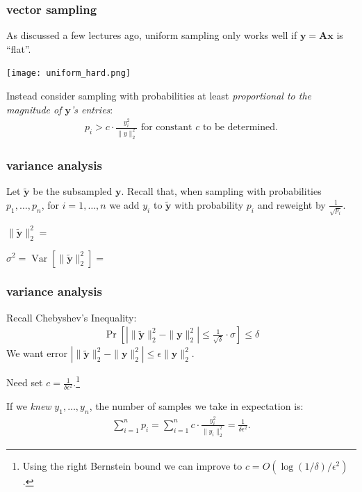 \documentclass[compress]{beamer}
\newcommand{\bv}[1]{\mathbf{#1}}
\DeclareMathOperator{\Var}{Var}
\begin{document}
\begin{frame}[t]
	\frametitle{vector sampling}
	As discussed a few lectures ago, uniform sampling only works well if $\bv{y} = \bv{A}\bv{x}$ is ``flat''. 
	\vspace{-.5em}
	\begin{center}
		\texttt{[image: uniform\_hard.png]}
	\end{center}
	\vspace{-.5em}
		
	Instead consider sampling with probabilities at least \emph{proportional to the magnitude of $\bv{y}$'s entries}:
	\begin{align*}
		p_i > c\cdot \frac{y_i^2}{\|y\|_2^2} \text{ for constant $c$ to be determined.}
	\end{align*}
\end{frame}

\begin{frame}[t]
	\frametitle{variance analysis}	
	Let $\tilde{\bv{y}}$ be the subsampled $\bv{y}$. Recall that, when sampling with probabilities $p_1, \ldots, p_n$, for $i = 1,\ldots, n$ we add $y_i$ to $\tilde{\bv{y}}$ with probability $p_i$ and reweight by $\frac{1}{\sqrt{p_i}}$. 
	
	$\|\tilde{\bv{y}}\|_2^2 = $
	
	$\sigma^2 = \Var[\|\tilde{\bv{y}}\|_2^2] = $
\end{frame}	

\begin{frame}[t]
	\frametitle{variance analysis}	
	Recall Chebyshev's Inequality:
	\begin{align*}
		\Pr[\left|\|\tilde{\bv{y}}\|_2^2 - \|\bv{y}\|_2^2\right| \leq \frac{1}{\sqrt{\delta}}\cdot \sigma] \leq \delta
	\end{align*}
	We want error $\left|\|\tilde{\bv{y}}\|_2^2 - \|\bv{y}\|_2^2\right| \leq \epsilon \|\bv{y}\|_2^2$. 
	
	Need set $c = \frac{1}{\delta\epsilon^2}$.\footnote{\footnotesize Using the right Bernstein bound we can improve to $c  = O(\log(1/\delta)/\epsilon^2)$.} 
	
	If we \emph{knew} $y_1, \ldots, y_n$, the number of samples we take in expectation is:
	\begin{align*}
		\sum_{i=1}^n p_i = \sum_{i=1}^n c\cdot \frac{y_i^2}{\|y_i\|_2^2} = \frac{1}{\delta\epsilon^2}. 
	\end{align*}
\end{frame}
\end{document}
